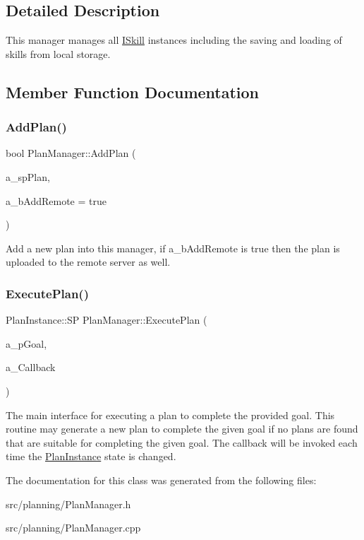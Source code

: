 \subsection{Detailed Description}
This manager manages all \hyperlink{class_i_skill}{I\+Skill} instances including the saving and loading of skills from local storage. 

\subsection{Member Function Documentation}
\mbox{\label{class_plan_manager_ad53eba96fe9bf9551eec3281d9bcb6db}} 
\subsubsection{\texorpdfstring{Add\+Plan()}{AddPlan()}}
{\footnotesize\ttfamily bool Plan\+Manager\+::\+Add\+Plan (\begin{DoxyParamCaption}\item[{const Plan\+::\+SP \&}]{a\+\_\+sp\+Plan,  }\item[{bool}]{a\+\_\+b\+Add\+Remote = {\ttfamily true} }\end{DoxyParamCaption})}

Add a new plan into this manager, if a\+\_\+b\+Add\+Remote is true then the plan is uploaded to the remote server as well. \mbox{\label{class_plan_manager_a6208be809c2d01d556dfa4f56aa5e1b6}} 
\subsubsection{\texorpdfstring{Execute\+Plan()}{ExecutePlan()}}
{\footnotesize\ttfamily Plan\+Instance\+::\+SP Plan\+Manager\+::\+Execute\+Plan (\begin{DoxyParamCaption}\item[{\hyperlink{class_goal_a818ae12a4d1f28bd433dab2a830a390e}{Goal\+::\+SP}}]{a\+\_\+p\+Goal,  }\item[{State\+Callback}]{a\+\_\+\+Callback }\end{DoxyParamCaption})}

The main interface for executing a plan to complete the provided goal. This routine may generate a new plan to complete the given goal if no plans are found that are suitable for completing the given goal. The callback will be invoked each time the \hyperlink{class_plan_instance}{Plan\+Instance} state is changed. 

The documentation for this class was generated from the following files\+:\begin{DoxyCompactItemize}
\item 
src/planning/Plan\+Manager.\+h\item 
src/planning/Plan\+Manager.\+cpp\end{DoxyCompactItemize}
